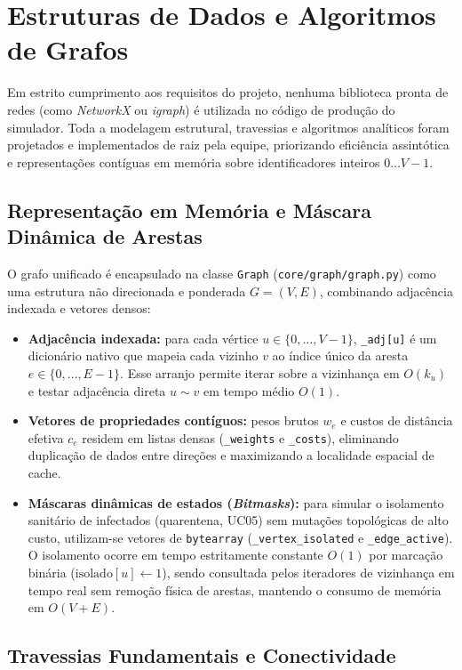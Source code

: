 \documentclass[11pt]{article}
\begin{document}
\section{Estruturas de Dados e Algoritmos de Grafos} \label{sec:algoritmos}

Em estrito cumprimento aos requisitos do projeto, nenhuma biblioteca pronta de redes (como \emph{NetworkX} ou \emph{igraph}) é utilizada no código de produção do simulador. Toda a modelagem estrutural, travessias e algoritmos analíticos foram projetados e implementados de raiz pela equipe, priorizando eficiência assintótica e representações contíguas em memória sobre identificadores inteiros $0 \dots V-1$.

\subsection{Representação em Memória e Máscara Dinâmica de Arestas}

O grafo unificado é encapsulado na classe \texttt{Graph} (\texttt{core/graph/graph.py}) como uma estrutura não direcionada e ponderada $G = (V, E)$, combinando adjacência indexada e vetores densos:
\begin{itemize}
  \item \textbf{Adjacência indexada:} para cada vértice $u \in \{0, \dots, V-1\}$, \texttt{\_adj[u]} é um dicionário nativo que mapeia cada vizinho $v$ ao índice único da aresta $e \in \{0, \dots, E-1\}$. Esse arranjo permite iterar sobre a vizinhança em $O(k_u)$ e testar adjacência direta $u \sim v$ em tempo médio $O(1)$.
  \item \textbf{Vetores de propriedades contíguos:} pesos brutos $w_e$ e custos de distância efetiva $c_e$ residem em listas densas (\texttt{\_weights} e \texttt{\_costs}), eliminando duplicação de dados entre direções e maximizando a localidade espacial de cache.
  \item \textbf{Máscaras dinâmicas de estados (\emph{Bitmasks}):} para simular o isolamento sanitário de infectados (quarentena, UC05) sem mutações topológicas de alto custo, utilizam-se vetores de \texttt{bytearray} (\texttt{\_vertex\_isolated} e \texttt{\_edge\_active}). O isolamento ocorre em tempo estritamente constante $O(1)$ por marcação binária ($\mathrm{isolado}[u] \gets 1$), sendo consultada pelos iteradores de vizinhança em tempo real sem remoção física de arestas, mantendo o consumo de memória em $O(V + E)$.
\end{itemize}

\subsection{Travessias Fundamentais e Conectividade}
\end{document}
